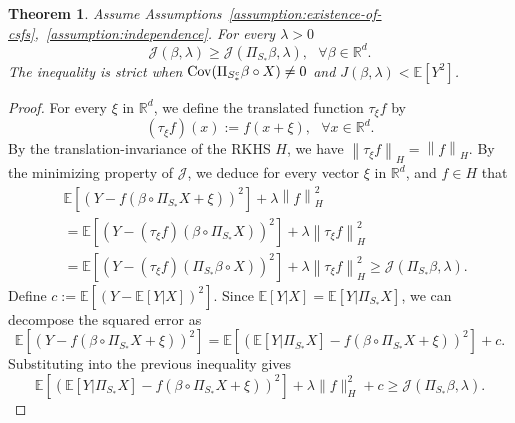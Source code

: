 \documentclass[sn-mathphys-num]{sn-jnl}%
\numberwithin{equation}{section}
\newcommand{\R}{\mathbb{R}}
\newcommand{\E}{\mathbb{E}}
\newcommand{\norm}[1]{\left\|{#1}\right\|} %
\newcommand{\Cov}{{\rm Cov}}
\theoremstyle{thmstyleone}%
\newtheorem{theorem}{Theorem}%
\theoremstyle{thmstyletwo}%
\theoremstyle{thmstylethree}%
\begin{document}
\begin{theorem}
\label{theorem:projection-reduce-function-value}
Assume Assumptions~\ref{assumption:existence-of-csfs},~\ref{assumption:independence}. For every $\lambda > 0$
\begin{equation*}
	\mathcal{J}(\beta, \lambda) \ge \mathcal{J}(\Pi_{S_*} \beta, \lambda),~~~\forall \beta \in \R^d.
\end{equation*} 
The inequality is strict when $\Cov(\Pi_{S_*^c} \beta \circ  X) \neq 0$ and $J(\beta, \lambda) < \E[Y^2]$.
\end{theorem} 

\begin{proof} 
For every $\xi$ in $\R^d$, we define the translated function $\tau_\xi f$ by
\begin{equation*}
	(\tau_\xi f)(x):= f(x+\xi),~~~\forall x \in \R^d.
\end{equation*}
By the translation-invariance of the RKHS $H$, we have $\norm{\tau_\xi f}_H = \norm{f}_H$. By the minimizing property of $\mathcal{J}$, we deduce for every vector $\xi$ in $\R^d$, and $f \in H$ that 
\begin{equation*}
\begin{split} 
	&\E[(Y - f( \beta \circ \Pi_{S_*} X + \xi))^2] + \lambda \norm{f}_H^2 \\
	&= \E[(Y - (\tau_\xi f)( \beta \circ \Pi_{S_*} X))^2] + \lambda \norm{\tau_\xi f}_H^2  \\
	&= \E[(Y - (\tau_\xi f)( \Pi_{S_*} \beta \circ X))^2] + \lambda \norm{\tau_\xi f}_H^2 
		\ge \mathcal{J}(\Pi_{S_*} \beta, \lambda).
\end{split} 
\end{equation*}
Define $c := \E[(Y - \E[Y|X])^2]$. Since $\E[Y|X] = \E[Y|\Pi_{S_*} X]$, we can decompose the squared error as
\[
\E[(Y - f(\beta \circ \Pi_{S_*} X + \xi))^2] = \E\left[(\E[Y|\Pi_{S_*} X] - f(\beta \circ \Pi_{S_*} X + \xi))^2\right] + c.
\]
Substituting into the previous inequality gives
\[
\E\left[(\E[Y|\Pi_{S_*} X] - f(\beta \circ \Pi_{S_*} X + \xi))^2\right] + \lambda \|f\|_H^2 + c \ge \mathcal{J}(\Pi_{S_*} \beta, \lambda).
\]


\end{proof}
\end{document}
